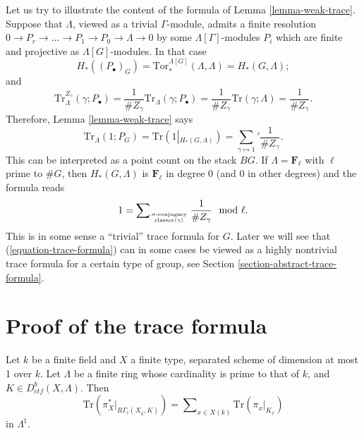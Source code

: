 \begin{remark}
\label{remark-content-trivial-trace}
Let us try to illustrate the content of the formula of
Lemma \ref{lemma-weak-trace}.
Suppose that $\Lambda$, viewed as a trivial $\Gamma$-module, admits a finite
resolution
$
0\to P_r\to \ldots \to P_1 \to P_0\to \Lambda\to 0
$
by some $\Lambda[\Gamma]$-modules $P_i$ which are finite and projective as
$\Lambda[G]$-modules. In that case
$$
H_*\left(\left(P_\bullet\right)_G\right) =
\text{Tor}_*^{\Lambda[G]}\left(\Lambda, \Lambda\right) = H_*(G, \Lambda) ;
$$
and
$$
\text{Tr}_\Lambda^{Z_\gamma}\left(\gamma; P_\bullet\right) =\frac{1}{\#
Z_\gamma}\text{Tr}_\Lambda(\gamma; P_\bullet)=\frac{1}{\#
Z_\gamma}\text{Tr}(\gamma;\Lambda) = \frac{1}{\# Z_\gamma}.
$$
Therefore, Lemma \ref{lemma-weak-trace} says
$$
\text{Tr}_\Lambda (1 ; P_G)
= \text{Tr}\left(1\left|_{H_*(G, \Lambda)}\right.\right)
= {\sum_{\gamma\mapsto1}}'\frac{1}{\# Z_\gamma}.
$$
This can be interpreted as a point count on the stack $BG$. If
$\Lambda = \mathbf{F}_\ell$ with $\ell$ prime to $\#G$, then
$H_*(G, \Lambda)$ is $\mathbf{F}_\ell$ in degree 0 (and $0$ in
other degrees) and the formula reads
$$
1 =
\sum\nolimits_{\sigma\text{-conjugacy}\atop \text{classes}\left<\gamma\right>}
\frac{1}{\# Z_\gamma}\mod{\ell}.
$$
This is in some sense a ``trivial'' trace formula for $G$.
Later we will see that (\ref{equation-trace-formula}) can in
some cases be viewed as a highly nontrivial trace formula for a
certain type of group, see
Section \ref{section-abstract-trace-formula}.
\end{remark}





\section{Proof of the trace formula}
\label{section-proof-trace-formula}

\begin{theorem}
\label{theorem-trace-formula-again}
Let $k$ be a finite field and $X$ a finite type, separated scheme of dimension
at most 1 over $k$. Let $\Lambda$ be a finite ring whose cardinality is prime
to that of $k$, and $K\in D_{ctf}^b(X, \Lambda)$. Then
\begin{equation}
\label{equation-trace-formula-again}
\text{Tr} \left(\pi_X^*\big|_{R\Gamma_c(X_{\bar k}, K)}\right)
=
\sum\nolimits_{x\in X(k)}
\text{Tr}\left(\pi_x\big|_{K_{\bar x}}\right)
\end{equation}
in $\Lambda^{\natural}$.
\end{theorem}


